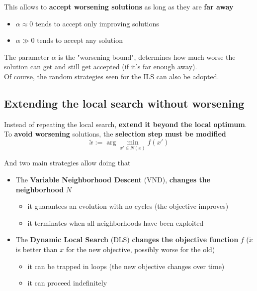 This allows to \textbf{accept worsening solutions} as long as they are \textbf{far away}
\begin{itemize}
	\item $\alpha \approx 0$ tends to accept only improving solutions
	
	\item $\alpha \gg 0$ tends to accept any solution
\end{itemize}
The parameter $\alpha$ is the "worsening bound", determines how much worse the solution can get and still get accepted (if it's far enough away).\\

Of course, the random strategies seen for the ILS can also be adopted.\\


\newpage

\subsection{Extending the local search without worsening}

Instead of repeating the local search, \textbf{extend it beyond the local optimum}.\\

To \textbf{avoid worsening} solutions, the \textbf{selection step must be modified}
$$ \tilde{x} := \arg \min_{x' \in N(x)} f (x') $$

And two main strategies allow doing that
\begin{itemize}
	\item The \textbf{Variable Neighborhood Descent} (VND), \textbf{changes the neighborhood} $N$
	\begin{itemize}
		\item it guarantees an evolution with no cycles (the objective improves)
		\item it terminates when all neighborhoods have been exploited
	\end{itemize}
	\nn
	
	\item The \textbf{Dynamic Local Search} (DLS) \textbf{changes the objective function} $f$ ($\tilde{x}$ is better than $x$ for the new objective, possibly worse for the old)
	\begin{itemize}
		\item it can be trapped in loops (the new objective changes over time)
		\item it can proceed indefinitely
	\end{itemize}
	\nn
\end{itemize}

